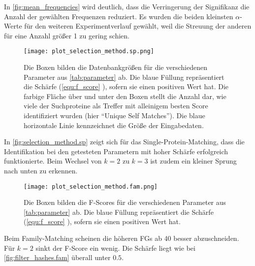        In \autoref{fig:mean_frequencies} wird deutlich, dass die Verringerung der Signifikanz die Anzahl der gewählten Frequenzen reduziert. Es wurden die beiden kleinsten $\alpha$-Werte für den weiteren Experimentverlauf gewählt, weil die Streuung der anderen für eine Anzahl größer 1 zu gering schien.

        \begin{figure}[H]
            \centering
            \texttt{[image: plot\_selection\_method.sp.png]}
            \caption[Single-Protein-Matching ]{Die Boxen bilden die Datenbankgrößen für die verschiedenen Parameter aus \autoref{tab:parameter} ab. Die blaue Füllung repräsentiert die Schärfe (\autoref{equ:f_score} ), sofern sie einen positiven Wert hat. Die farbige Fläche über und unter den Boxen stellt die Anzahl dar, wie viele der Suchproteine als Treffer mit alleinigem besten Score identifiziert wurden (hier ``Unique Self Matches''). Die blaue horizontale Linie kennzeichnet die Größe der Eingabedaten.}
            \label{fig:selection_method.sp}
        \end{figure}

        In \autoref{fig:selection_method.sp} zeigt sich für das Single-Protein-Matching, dass die Identifikation bei den getesteten Parametern mit hoher Schärfe erfolgreich funktionierte. Beim Wechsel von $k=2$ zu $k=3$ ist zudem ein kleiner Sprung nach unten zu erkennen.

        \begin{figure}[H]
            \centering
            \texttt{[image: plot\_selection\_method.fam.png]}
            \caption[Family-Matching ]{Die Boxen bilden die F-Scores für die verschiedenen Parameter aus \autoref{tab:parameter} ab. Die blaue Füllung repräsentiert die Schärfe (\autoref{equ:f_score} ), sofern sie einen positiven Wert hat.}
            \label{fig:selection_method.fam}
        \end{figure}

        Beim Family-Matching scheinen die höheren \acp{FG} ab 40 besser abzuschneiden. Für $k=2$ sinkt der F-Score ein wenig. Die Schärfe liegt wie bei \autoref{fig:filter_hashes.fam} überall unter $0.5$.
